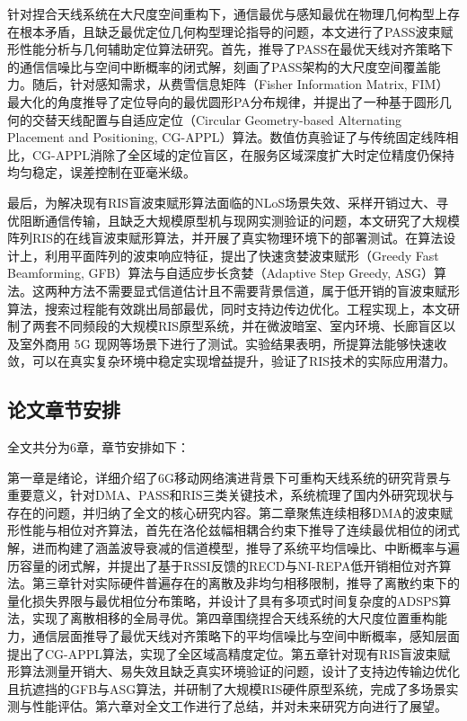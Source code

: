 针对捏合天线系统在大尺度空间重构下，通信最优与感知最优在物理几何构型上存在根本矛盾，且缺乏最优定位几何构型理论指导的问题，本文进行了PASS波束赋形性能分析与几何辅助定位算法研究。首先，推导了PASS在最优天线对齐策略下的通信信噪比与空间中断概率的闭式解，刻画了PASS架构的大尺度空间覆盖能力。随后，针对感知需求，从费雪信息矩阵（Fisher Information Matrix, FIM）最大化的角度推导了定位导向的最优圆形PA分布规律，并提出了一种基于圆形几何的交替天线配置与自适应定位（Circular Geometry-based Alternating Placement and Positioning, CG-APPL）算法。数值仿真验证了与传统固定线阵相比，CG-APPL消除了全区域的定位盲区，在服务区域深度扩大时定位精度仍保持均匀稳定，误差控制在亚毫米级。

最后，为解决现有RIS盲波束赋形算法面临的NLoS场景失效、采样开销过大、寻优阻断通信传输，且缺乏大规模原型机与现网实测验证的问题，本文研究了大规模阵列RIS的在线盲波束赋形算法，并开展了真实物理环境下的部署测试。在算法设计上，利用平面阵列的波束响应特征，提出了快速贪婪波束赋形（Greedy Fast Beamforming, GFB）算法与自适应步长贪婪（Adaptive Step Greedy, ASG）算法。这两种方法不需要显式信道估计且不需要背景信道，属于低开销的盲波束赋形算法，搜索过程能有效跳出局部最优，同时支持边传边优化。工程实现上，本文研制了两套不同频段的大规模RIS原型系统，并在微波暗室、室内环境、长廊盲区以及室外商用 5G 现网等场景下进行了测试。实验结果表明，所提算法能够快速收敛，可以在真实复杂环境中稳定实现增益提升，验证了RIS技术的实际应用潜力。


\subsection{论文章节安排}\label{sec:arrangement}

全文共分为6章，章节安排如下：

第一章是绪论，详细介绍了6G移动网络演进背景下可重构天线系统的研究背景与重要意义，针对DMA、PASS和RIS三类关键技术，系统梳理了国内外研究现状与存在的问题，并归纳了全文的核心研究内容。第二章聚焦连续相移DMA的波束赋形性能与相位对齐算法，首先在洛伦兹幅相耦合约束下推导了连续最优相位的闭式解，进而构建了涵盖波导衰减的信道模型，推导了系统平均信噪比、中断概率与遍历容量的闭式解，并提出了基于RSSI反馈的RECD与NI-REPA低开销相位对齐算法。第三章针对实际硬件普遍存在的离散及非均匀相移限制，推导了离散约束下的量化损失界限与最优相位分布策略，并设计了具有多项式时间复杂度的ADSPS算法，实现了离散相移的全局寻优。第四章围绕捏合天线系统的大尺度位置重构能力，通信层面推导了最优天线对齐策略下的平均信噪比与空间中断概率，感知层面提出了CG-APPL算法，实现了全区域高精度定位。第五章针对现有RIS盲波束赋形算法测量开销大、易失效且缺乏真实环境验证的问题，设计了支持边传输边优化且抗遮挡的GFB与ASG算法，并研制了大规模RIS硬件原型系统，完成了多场景实测与性能评估。第六章对全文工作进行了总结，并对未来研究方向进行了展望。
